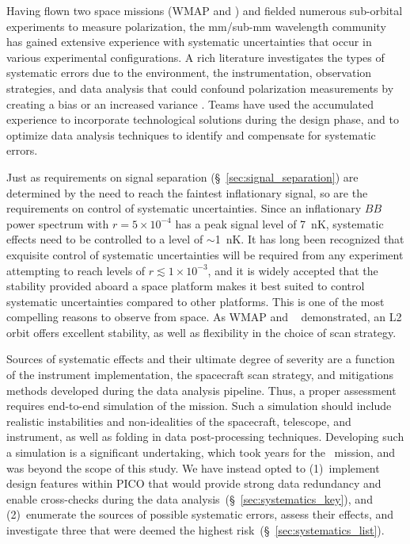 \documentclass[PICOReport.tex]{subfiles}
\begin{document}
Having flown two space missions (WMAP and \planck ) and fielded numerous sub-orbital experiments to measure polarization, the mm/sub-mm wavelength community has gained extensive experience with systematic uncertainties that occur in various experimental configurations. 
A rich literature investigates the types of systematic errors due to the environment, the instrumentation, observation strategies, and data analysis that could confound polarization measurements by creating a bias or an increased variance \cite{hu03,shimon2008,yadav2010,Griffiths2014,LFI_systematics,Kaplan2002,Miller2009,Pagano2009}. Teams have used the accumulated experience to incorporate technological solutions during the design phase, and to optimize data analysis techniques to identify and compensate for systematic errors. 

Just as requirements on signal separation (\S~\ref{sec:signal_separation}) are determined by the need to reach the faintest inflationary signal, so are the requirements on control of systematic uncertainties. Since an inflationary $BB$ power spectrum with $r = 5 \times 10^{-4}$ has a peak signal level of 7~nK, systematic effects need to be controlled to a level of $\sim$1~nK. It has long been recognized that exquisite control of systematic uncertainties will be required from any experiment attempting to reach levels of $r \lesssim 1\times 10^{-3}$, and it is widely accepted that the stability provided aboard a space platform makes it best suited to control systematic uncertainties compared to other platforms. This is one of the most compelling reasons to observe from space.  As WMAP and \planck~ demonstrated, an L2 orbit offers excellent stability, as well as flexibility in the choice of scan strategy.  

Sources of systematic effects and their ultimate degree of severity are a function of the instrument implementation, the spacecraft scan strategy, and mitigations methods developed during the data analysis pipeline. Thus, a proper assessment requires end-to-end simulation of the mission. Such a simulation should include realistic instabilities and non-idealities of the spacecraft, telescope, and instrument, as well as folding in data post-processing techniques. Developing such a simulation is a significant undertaking, which took years  for the \planck\ mission, and was beyond the scope of this study. We have instead opted to (1)~implement design features within PICO that would provide strong data redundancy and enable cross-checks during the data analysis~(\S~\ref{sec:systematics_key}), and (2)~enumerate the sources of possible systematic errors, assess their effects, and investigate three that were deemed the highest risk~(\S~\ref{sec:systematics_list}). 
\end{document}
